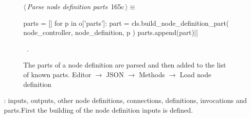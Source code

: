 \documentclass[%
    a4paper,    %
    justified,  %
    nobib,      %
    openany     %
]{tufte-book}
\makeatletter
\renewcommand{\label}[1]{\@tufte@label{##1}}%
\makeatother
\begin{document}
\begin{figure}[!htbp]
\begin{flushleft} \small
\begin{minipage}{\linewidth}\label{scrap132}\raggedright\small
{} $\langle\,${\itshape Parse node definition parts}\nobreak\ {\footnotesize {165c}}$\,\rangle\equiv$
\vspace{-1ex}
\begin{pythoncode}
parts = []
for p in o['parts']:
    part = cls.build_node_definition_part(
        node_controller, node_definition, p
    )
    parts.append(part)|\NWsep|
\end{pythoncode}
\vspace{1.5ex}
\footnotesize
\begin{list}{}{\setlength{\itemsep}{-\parsep}\setlength{\itemindent}{-\leftmargin}}
\item \NWtxtMacroRefIn\ .

\item{}
\end{list}
\end{minipage}\vspace{4ex}
\end{flushleft}
\caption{The parts of a node definition are parsed and then added to
the list of known parts.
  \newline{}\newline{}Editor $\rightarrow$ JSON $\rightarrow$
  Methods $\rightarrow$ Load node definition}
\end{figure}

: inputs, outputs,
other node definitions, connections, definitions, invocations and parts.First
the building of the node definition inputs is defined.
\end{document}

